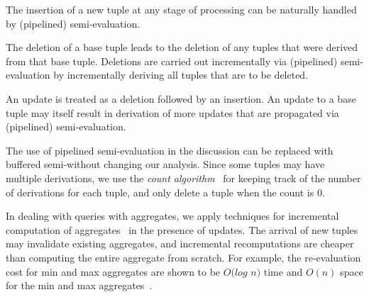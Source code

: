 \vspace{1pt}

 The insertion of a new tuple at any stage of
  processing can be naturally handled by (pipelined) semi-\naive evaluation. 

\vspace{1pt}

The deletion of a base tuple leads to the
  deletion of any tuples that were derived from that
  base tuple.  Deletions are carried out incrementally via (pipelined)
  semi-\naive
  evaluation by incrementally deriving all tuples that are to be
  deleted. 

\vspace{1pt}

An update is treated as a deletion followed by an
  insertion. An update to a base tuple may itself result in derivation
  of more updates that are propagated via (pipelined)
  semi-\naive evaluation. 
\vspace{1pt}


The use of pipelined semi-\naive evaluation in the discussion can be replaced with
buffered semi-\naive without changing our analysis.
Since some tuples may have multiple derivations, we use the
{\em count algorithm}~\cite{viewIncremental} for keeping track of the
number of derivations for each tuple, and only delete a tuple when the
count is 0.

In dealing with queries with aggregates, we apply techniques for incremental computation of
aggregates~\cite{rossAggregate} in the presence of updates. The arrival of new
tuples may invalidate existing aggregates, and incremental
recomputations are cheaper than computing the entire aggregate from
scratch. For example, the re-evaluation cost for min and max aggregates are shown
to be $O(log$ $n)$ time and $O(n)$ space for the min and max
aggregates~\cite{rossAggregate}. 


